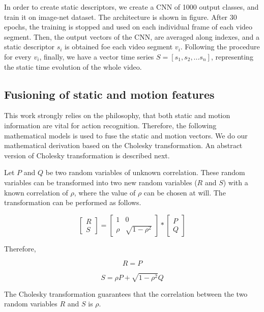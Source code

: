 In order to create static descriptors, we create a CNN of 1000 output classes, and train it on image-net dataset. The architecture is shown in figure.
After 30 epochs, the training is stopped and used on each individual frame of each video segment. Then, the output vectors of the CNN,
are averaged 
along indexes, and a static descriptor $s_{i}$ is obtained foe each video segment $v_{i}$. Following the 
procedure for every $v_{i}$, finally, we have a vector time series 
$S =[s_{1}, s_{2},...s_{n}]$, representing the static time evolution of the whole video. 

\subsection{Fusioning of static and motion features}
This work strongly relies on the philosophy, that both static and motion information
are vital for action recognition. Therefore, the following mathematical models is used
to fuse the static and motion vectors. We do our mathematical derivation based on the Cholesky transformation. An 
abstract version of Cholesky transformation is described next. 

Let $P$ and $Q$ be two random variables of unknown correlation. These random variables can be
transformed into two new random variables ($R$ and $S$) with a known correlation of $\rho$, where the 
value of $\rho$ can be chosen at will. The transformation can be performed as follows.

\[
\begin{bmatrix}
    R     \\
    S     
\end{bmatrix}
=
\begin{bmatrix}
    1  & 0 \\
    \rho  & \sqrt{1-\rho^2}    
\end{bmatrix}
*
\begin{bmatrix}
    P     \\
    Q     
\end{bmatrix}
\]

Therefore,

\begin{equation}
R = P
\end{equation}

\begin{equation}
S = \rho P + \sqrt{1-\rho^2}Q
\end{equation}

The Cholesky transformation guarantees that the correlation between the two random variables
$R$ and $S$ is $\rho$.

